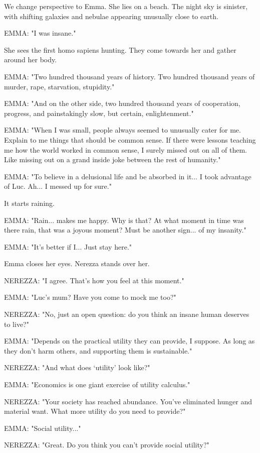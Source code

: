 \documentclass[11pt]{article}
\begin{document}
We change perspective to Emma. 
She lies on a beach.
The night sky is sinister, with shifting galaxies and nebulae appearing unusually close to earth.

EMMA: "I was insane."

She sees the first homo sapiens hunting.
They come towards her and gather around her body.

EMMA: "Two hundred thousand years of history.
Two hundred thousand years of murder, rape, starvation, stupidity."

EMMA: "And on the other side, two hundred thousand years of cooperation, progress, and painstakingly slow, but certain, enlightenment."

EMMA: "When I was small, people always seemed to unusually cater for me.
Explain to me things that should be common sense.
If there were lessons teaching me how the world worked in common sense, I surely missed out on all of them.
Like missing out on a grand inside joke between the rest of humanity."

EMMA: "To believe in a delusional life and be absorbed in it...
I took advantage of Luc.
Ah... I messed up for sure."

It starts raining.

EMMA: "Rain... makes me happy. 
Why is that?
At what moment in time was there rain, that was a joyous moment?
Must be another sign... of my insanity."

EMMA: "It's better if I... 
Just stay here."

Emma closes her eyes.
Nerezza stands over her. 

NEREZZA: "I agree. 
That's how you feel at this moment."

EMMA: "Luc's mum? Have you come to mock me too?"

NEREZZA: "No, just an open question: do you think an insane human deserves to live?"

EMMA: "Depends on the practical utility they can provide, I suppose.
As long as they don't harm others, and supporting them is sustainable."

NEREZZA: "And what does `utility' look like?"

EMMA: "Economics is one giant exercise of utility calculus."

NEREZZA: "Your society has reached abundance.
You've eliminated hunger and material want.
What more utility do you need to provide?"

EMMA: "Social utility..."

NEREZZA: "Great. Do you think you can't provide social utility?"
\end{document}
